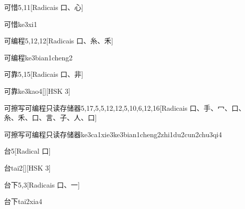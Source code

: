 \begin{entry}{可惜}{5,11}[Radicais ⼝、⼼]
  \begin{phonetics}{可惜}{ke3xi1}
  \end{phonetics}
\end{entry}

\begin{entry}{可编程}{5,12,12}[Radicais ⼝、⽷、⽲]
  \begin{phonetics}{可编程}{ke3bian1cheng2}
  \end{phonetics}
\end{entry}

\begin{entry}{可靠}{5,15}[Radicais ⼝、⾮]
  \begin{phonetics}{可靠}{ke3kao4}[][HSK 3]
  \end{phonetics}
\end{entry}

\begin{entry*}{可擦写可编程只读存储器}{5,17,5,5,12,12,5,10,6,12,16}[Radicais ⼝、⼿、⼍、⼝、⽷、⽲、⼝、⾔、⼦、⼈、⼝]
  \begin{phonetics}{可擦写可编程只读存储器}{ke3ca1xie3ke3bian1cheng2zhi1du2cun2chu3qi4}
  \end{phonetics}
\end{entry*}

\begin{entry}{台}{5}[Radical ⼝]
  \begin{phonetics}{台}{tai2}[][HSK 3]
  \end{phonetics}
\end{entry}

\begin{entry}{台下}{5,3}[Radicais ⼝、⼀]
  \begin{phonetics}{台下}{tai2xia4}
  \end{phonetics}
\end{entry}

